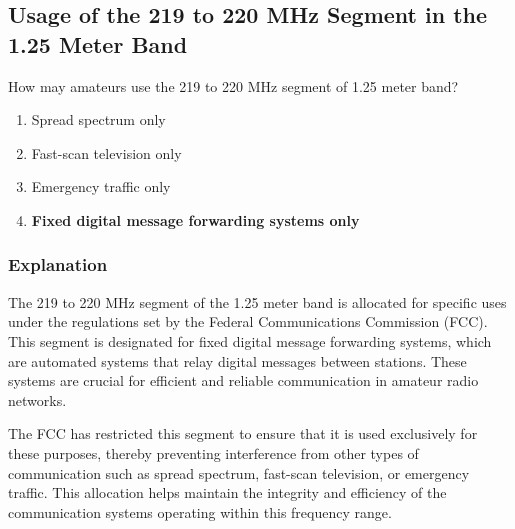 \subsection{Usage of the 219 to 220 MHz Segment in the 1.25 Meter Band}
\label{T1B05}

\begin{tcolorbox}[colback=gray!10!white,colframe=black!75!black,title=T1B05]
How may amateurs use the 219 to 220 MHz segment of 1.25 meter band?
\begin{enumerate}[label=\Alph*)]
    \item Spread spectrum only
    \item Fast-scan television only
    \item Emergency traffic only
    \item \textbf{Fixed digital message forwarding systems only}
\end{enumerate}
\end{tcolorbox}

\subsubsection{Explanation}
The 219 to 220 MHz segment of the 1.25 meter band is allocated for specific uses under the regulations set by the Federal Communications Commission (FCC). This segment is designated for fixed digital message forwarding systems, which are automated systems that relay digital messages between stations. These systems are crucial for efficient and reliable communication in amateur radio networks. 

The FCC has restricted this segment to ensure that it is used exclusively for these purposes, thereby preventing interference from other types of communication such as spread spectrum, fast-scan television, or emergency traffic. This allocation helps maintain the integrity and efficiency of the communication systems operating within this frequency range.

